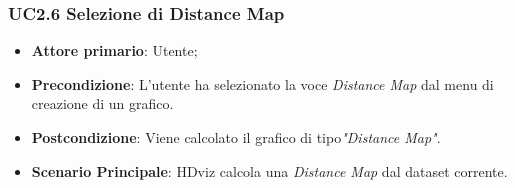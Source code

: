 \subsubsection{UC2.6 Selezione di Distance Map}
\label{ssub:UC2.6}
\begin{itemize}
	\item \textbf{Attore primario}:		Utente;
	\item \textbf{Precondizione}:		L'utente ha selezionato la voce \emph{Distance Map} dal menu di creazione di un grafico.
	\item \textbf{Postcondizione}:		Viene calcolato il grafico di tipo\emph{"Distance Map"}.
	\item \textbf{Scenario Principale}: HDviz calcola una  \emph{Distance Map} dal dataset corrente.
\end{itemize}